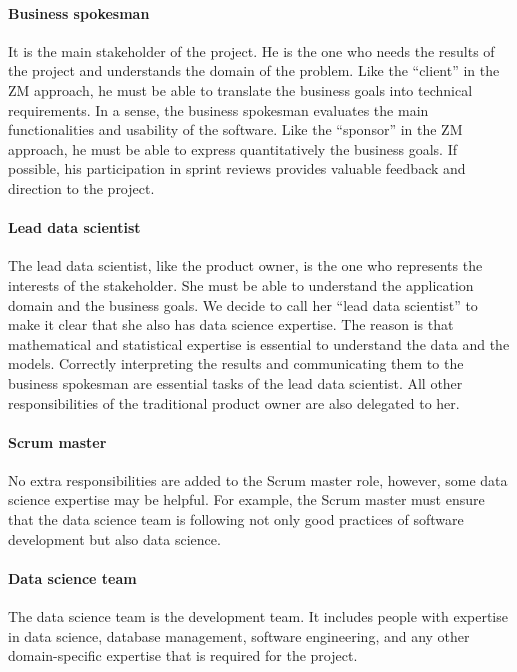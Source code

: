 \paragraph{Business spokesman}  It is the main stakeholder of the project.
He is the one who needs the results of the project and understands the domain of the
problem.  Like the ``client'' in the ZM approach, he must be able to translate the business
goals into technical requirements.  In a sense, the business spokesman evaluates the main
functionalities and usability of the software.  Like the ``sponsor'' in the ZM approach, he
must be able to express quantitatively the business goals.  If possible, his participation
in sprint reviews provides valuable feedback and direction to the project.

\paragraph{Lead data scientist}  The lead data scientist, like the product owner, is the
one who represents the interests of the stakeholder.  She must be able to understand the
application domain and the business goals.  We decide to call her ``lead data scientist''
to make it clear that she also has data science expertise.  The reason is that mathematical
and statistical expertise is essential to understand the data and the models.
Correctly interpreting the results and communicating them to the business spokesman are
essential tasks of the lead data scientist.  All other responsibilities of the traditional
product owner are also delegated to her.

\paragraph{Scrum master} No extra responsibilities are added to the Scrum master role,
however, some data science expertise may be helpful.  For example, the Scrum master must
ensure that the data science team is following not only good practices of software
development but also data science.

\paragraph{Data science team}  The data science team is the development team.  It includes
people with expertise in data science, database management, software engineering, and any
other domain-specific expertise that is required for the project.

